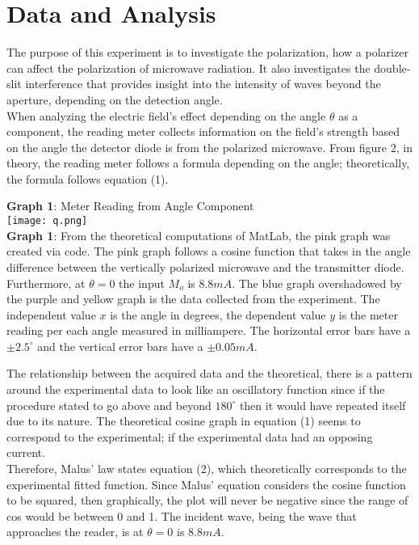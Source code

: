 \documentclass[11pt]{article}
\begin{document}
\section*{Data and Analysis}
The purpose of this experiment is to investigate the polarization, how a polarizer can affect the polarization of microwave radiation. It also investigates the double-slit interference that provides insight into the intensity of waves beyond the aperture, depending on the detection angle.\\
When analyzing the electric field's effect depending on the angle $\theta$ as a component, the reading meter collects information on the field's strength based on the angle the detector diode is from the polarized microwave. From figure 2, in theory, the reading meter follows a formula depending on the angle; theoretically, the formula follows equation (1). 
\newpage
\begin{center}
    \textbf{Graph 1}: Meter Reading from Angle Component \\
    \texttt{[image: q.png]}\\\textbf{Graph 1}: From the theoretical computations of MatLab, the pink graph was created via code. The pink graph follows a cosine function that takes in the angle difference between the vertically polarized microwave and the transmitter diode. Furthermore, at $\theta=0$ the input $M_o$ is $8.8 mA$. The blue graph overshadowed by the purple and yellow graph is the data collected from the experiment. The independent value $x$ is the angle in degrees, the dependent value $y$ is the meter reading per each angle measured in milliampere. The horizontal error bars have a $\pm 2.5^\circ$ and the vertical error bars have a $\pm 0.05 mA$.
\end{center}
The relationship between the acquired data and the theoretical, there is a pattern around the experimental data to look like an oscillatory function since if the procedure stated to go above and beyond $180^\circ$ then it would have repeated itself due to its nature.  The theoretical cosine graph in equation (1) seems to correspond to the experimental; if the experimental data had an opposing current.\\
Therefore, Malus' law states equation (2), which theoretically corresponds to the experimental fitted function. Since Malus' equation considers the cosine function to be squared, then graphically, the plot will never be negative since the range of cos would be between 0 and 1. The incident wave, being the wave that approaches the reader, is at $\theta=0$ is $8.8mA$.\\
\end{document}
